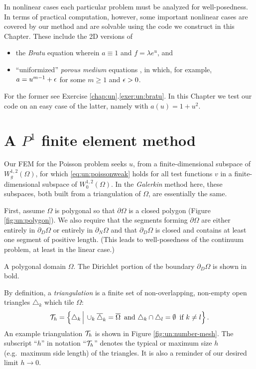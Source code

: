 In nonlinear cases each particular problem must be analyzed for well-posedness.  In terms of practical computation, however, some important nonlinear cases are covered by our method and are solvable using the code we construct in this Chapter.  These include the 2D versions of
\begin{itemize}
\item the \emph{Bratu} equation wherein $a\equiv 1$ and $f=\lambda e^u$, and
\item ``uniformized'' \emph{porous medium} equations \citep{Ockendonetal2003}, in which, for example, $a=u^{m-1}+\epsilon$ for some $m\ge 1$ and $\epsilon>0$.
\end{itemize}
For the former see Exercise \ref{chap:un}.\ref{exer:un:bratu}.  In this Chapter we test our code on an easy case of the latter, namely with $a(u)=1+u^2$.


\section{A $P^1$ finite element method}

Our FEM for the Poisson problem seeks $u$, from a finite-dimensional subspace of $W^{1,2}_g(\Omega)$, for which \eqref{eq:un:poissonweak} holds for all test functions $v$ in a finite-dimensional subspace of $W^{1,2}_0(\Omega)$.  In the \emph{Galerkin} method here, these subspaces, both built from a triangulation of $\Omega$, are essentially the same.

First, assume $\Omega$ is polygonal so that $\partial\Omega$ is a closed polygon (Figure \ref{fig:un:polygon}).  We also require that the segments forming $\partial\Omega$ are either entirely in $\partial_D\Omega$ or entirely in $\partial_N\Omega$ and that $\partial_D\Omega$ is closed and contains at least one segment of positive length.  (This leads to well-posedness of the continuum problem, at least in the linear case.)

\begin{marginfigure}

\caption{A polygonal domain $\Omega$.  The Dirichlet portion of the boundary $\partial_D\Omega$ is shown in bold.}
\label{fig:un:polygon}
\end{marginfigure}

By definition, a \emph{triangulation} is a finite set of non-overlapping, non-empty open triangles $\triangle_k$ which tile $\Omega$:
\begin{equation}
\mathcal{T}_h = \left\{\triangle_k \,\Big|\, \cup_k \overline{\triangle}_k = \overline{\Omega} \, \text{ and} \,\, \triangle_k \cap \triangle_l = \emptyset \, \text{ if } k\ne l\right\}. \label{eq:un:triangulation}
\end{equation}
An example triangulation $\mathcal{T}_h$ is shown in Figure \ref{fig:un:number-mesh}.  The subscript ``$h$'' in notation ``$\mathcal{T}_h$'' denotes the typical or maximum size $h$ (e.g.~maximum side length) of the triangles.  It is also a reminder of our desired limit $h\to 0$.

